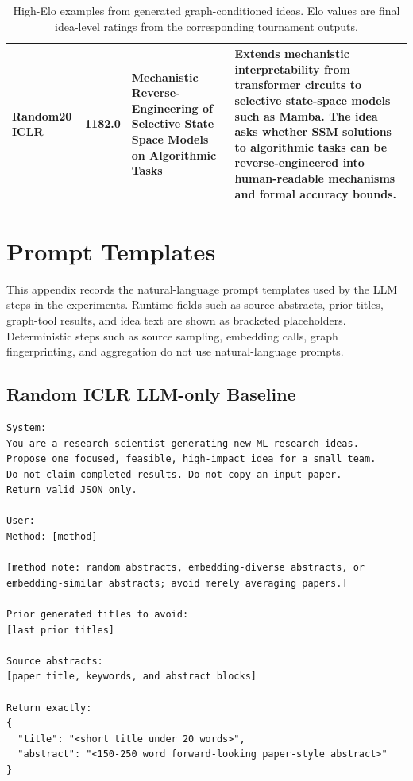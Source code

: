 \documentclass[10pt,twocolumn]{article}
\begin{document}
\begin{table}[t]
\begin{tabular}{p{}p{}p{}p{}}
Random20 ICLR & 1182.0 & Mechanistic Reverse-Engineering of Selective State Space Models on Algorithmic Tasks & Extends mechanistic interpretability from transformer circuits to selective state-space models such as Mamba.  The idea asks whether SSM solutions to algorithmic tasks can be reverse-engineered into human-readable mechanisms and formal accuracy bounds. \\
\bottomrule
\end{tabular}
\caption{High-Elo examples from generated graph-conditioned ideas.  Elo values are final idea-level ratings from the corresponding tournament outputs.}
\label{tab:examples}
\end{table}

\clearpage
\section{Prompt Templates}

This appendix records the natural-language prompt templates used by the LLM
steps in the experiments.  Runtime fields such as source abstracts, prior
titles, graph-tool results, and idea text are shown as bracketed placeholders.
Deterministic steps such as source sampling, embedding calls, graph
fingerprinting, and aggregation do not use natural-language prompts.

\subsection{Random ICLR LLM-only Baseline}
\begin{lstlisting}[style=promptbox]
System:
You are a research scientist generating new ML research ideas.
Propose one focused, feasible, high-impact idea for a small team.
Do not claim completed results. Do not copy an input paper.
Return valid JSON only.

User:
Method: [method]

[method note: random abstracts, embedding-diverse abstracts, or
embedding-similar abstracts; avoid merely averaging papers.]

Prior generated titles to avoid:
[last prior titles]

Source abstracts:
[paper title, keywords, and abstract blocks]

Return exactly:
{
  "title": "<short title under 20 words>",
  "abstract": "<150-250 word forward-looking paper-style abstract>"
}
\end{lstlisting}
\end{document}
